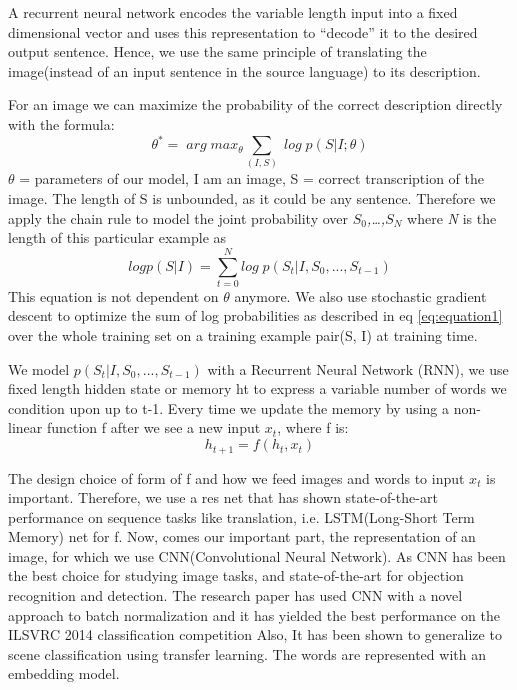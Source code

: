 \documentclass[a4paper,UKenglish,cleveref, autoref, thm-restate]{lipics-v2021}
\begin{document}
A recurrent neural network encodes the variable length input into a fixed dimensional vector and uses this representation to “decode” it to the desired output sentence. Hence, we use the same principle of translating the image(instead of an input sentence in the source language) to its description.

For an image we can maximize the probability of the correct description directly with the formula:
\[ \theta^{*} =\;  arg\; max_{\theta} \sum_{(I,S)}\; log\; p(S|I; \theta) \label{eq:equation1} \tag{1} \]
 $\theta$ = parameters of our model,
I am an image,
S = correct transcription of the image.
The length of S is unbounded, as it could be any sentence.
Therefore we apply the chain rule to model the joint probability over \textit{$S_{0}$,\ldots,$S_{N}$} where \textit{N} is the length of this particular example as
\[ log p(S|I) = \sum_{t=0}^{N}log\; p(S_{t}|I,S_{0},...,S_{t-1}) \label{eq:equation2} \tag{2} \]
This equation is not dependent on $\theta$ anymore.
We also use stochastic gradient descent to optimize the sum of log probabilities as described in eq \ref{eq:equation1} over the whole training set on a training example pair(S, I) at training time.

 We model $p(S_{t}|I,S_{0},...,S_{t-1})$  with a Recurrent Neural Network (RNN), we use fixed length hidden state or memory ht to express a variable number of words we condition upon up to t-1. Every time we update the memory by using a non-linear function f after we see a new input $x_{t}$, where f is:
 \[
 h_{t+1} = f(h_{t}, x_{t}) \label{eq:equation3} \tag{3} \]

The design choice of form of f and how we feed images and words to input $x_{t}$ is important. Therefore, we use a res net that has shown state-of-the-art performance on sequence tasks like translation, i.e. LSTM(Long-Short Term Memory) net for f.
Now, comes our important part, the representation of an image, for which we use CNN(Convolutional Neural Network).
As CNN has been the best choice for studying image tasks, and state-of-the-art for objection recognition and detection.
The research paper has used CNN with a novel approach to batch normalization and it has yielded the best performance on the ILSVRC 2014 classification competition Also, It has been shown to generalize to scene classification using transfer learning. The words are represented with an embedding model.
\end{document}
